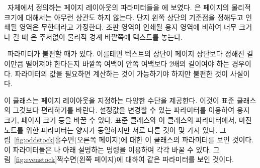 \ltx\ 자체에서 정의하는 페이지 레이아웃의 파라미터들을 에
보였다.
\ltx 은 페이지의 물리적 크기에 대해서는 아무런 상관도 하지 않는다.
단지 왼쪽 상단의 기준점을 정해두고 인쇄될 영역은 무한대라고 가정한다. 조판 영역이 인쇄될 용지 영역에 비하여
너무 크거나 길 때 \ltx 은 주저없이 물리적 경계 바깥쪽에 텍스트를
놓는다.

\ltx\ 파라미터가 불편할 때가 있다. 이를테면 텍스트의 상단이 페이지 상단보다
정해진 길이만큼 떨어져야 한다든지 바깥쪽 여백이 안쪽 여백보다 2배의 길이여야 하는 경우이다. 파라미터의 값을 필요하면 계산하는 것이
가능하기야 하지만 불편한 것이 사실이다.

이 클래스는 페이지 레이아웃을 지정하는 다양한 수단을 제공한다. 이것이 표준
클래스의 그것보다 편리하기를 바란다. 설정값을 변경할 수 있는 파라미터를 이용하여
용지 크기, 페이지 크기 등을 바꿀 수 있다.
표준 클래스와 이 클래스의 파라미터에서, 마진 노트를 위한 파라미터는 양자가 동일하지만 서로 다른 것이 몇 가지 있다. 그림~\ref{fig:oddstock}\은 홀수면(오른쪽 페이지)에 대한 이 클래스의 파라미터를 보인 것이다. 이 파라미터들은 \cmd{\setlength}나 아래 설명하는 명령을 이용하여 각각 바꿀 수 있다. 
그림~\ref{fig:evenstock}\은 짝수면(왼쪽 페이지)에 대하여 같은 파라미터를 보인 것이다.

